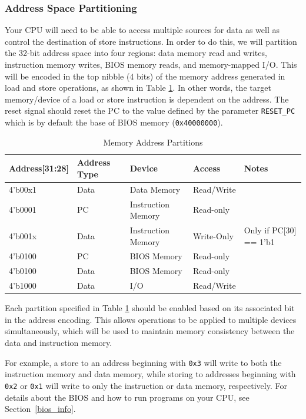 \documentclass[11pt]{article}
\begin{document}
\subsubsection{Address Space Partitioning}
Your CPU will need to be able to access multiple sources for data as well as control the destination of store instructions.
In order to do this, we will partition the 32-bit address space into four regions: data memory read and writes, instruction memory writes, BIOS memory reads, and memory-mapped I/O.
This will be encoded in the top nibble (4 bits) of the memory address generated in load and store operations, as shown in Table \ref{mem_space1}.
In other words, the target memory/device of a load or store instruction is dependent on the address.
The reset signal should reset the PC to the value defined by the parameter \verb|RESET_PC| which is by default the base of BIOS memory (\verb|0x40000000|).

\begin{table}[hbt]
  \begin{center}
    \caption{Memory Address Partitions}
    \label{mem_space1}
    \begin{tabular}{l l l l l}
      \bottomrule
      \textbf{Address[31:28]} & \textbf{Address Type} & \textbf{Device} & \textbf{Access} & \textbf{Notes} \\
      \midrule
      4'b00x1 & Data & Data Memory & Read/Write &\\
      4'b0001 & PC  &  Instruction Memory & Read-only &\\
      4'b001x & Data & Instruction Memory & Write-Only & Only if PC[30] == 1'b1\\
      4'b0100 & PC  & BIOS Memory & Read-only &\\
      4'b0100 & Data & BIOS Memory & Read-only &\\
      4'b1000 & Data & I/O & Read/Write &\\
      \bottomrule
    \end{tabular}
  \end{center}
\end{table}

Each partition specified in Table \ref{mem_space1} should be enabled based on its associated bit in the address encoding.
This allows operations to be applied to multiple devices simultaneously, which will be used to maintain memory consistency between the data and instruction memory.

For example, a store to an address beginning with \verb|0x3| will write to both the instruction memory and data memory, while storing to addresses beginning with \verb|0x2| or \verb|0x1| will write to only the instruction or data memory, respectively.
For details about the BIOS and how to run programs on your CPU, see Section~\ref{bios_info}.
\end{document}
